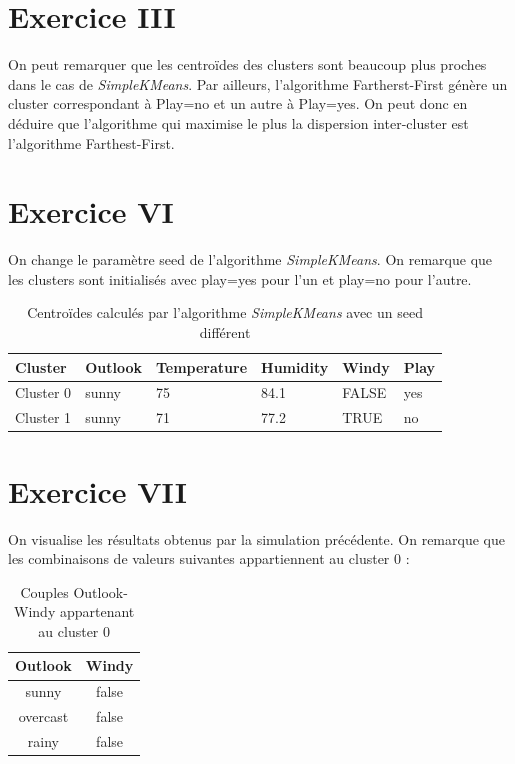 \documentclass[a4paper, 11pt]{report}
\begin{document}
        \section{Exercice III}
        On peut remarquer que les centroïdes des clusters sont beaucoup plus proches dans le cas de \emph{SimpleKMeans}. Par ailleurs, l'algorithme Fartherst-First génère un cluster correspondant à Play=no et un autre à Play=yes. On peut donc en déduire que l'algorithme qui maximise le plus la dispersion inter-cluster est l'algorithme Farthest-First.
        
        \section{Exercice VI}
        On change le paramètre seed de l'algorithme \emph{SimpleKMeans}. On remarque que les clusters sont initialisés avec play=yes pour l'un et play=no pour l'autre.
        \begin{table}[h!]
        \centering
        \begin{tabular}{| l | l | l | l | l | l |}
        \hline
        Cluster & Outlook & Temperature & Humidity & Windy & Play \\
        \hline
        Cluster 0 & sunny & 75 & 84.1 & FALSE & yes \\
        \hline
        Cluster 1 & sunny & 71 & 77.2 & TRUE & no \\
        \hline

        \end{tabular}
        \caption{Centroïdes calculés par l'algorithme \emph{SimpleKMeans} avec un seed différent}
        \label{tab:exo_6}
        \end{table}
        
        \section{Exercice VII}
        On visualise les résultats obtenus par la simulation précédente. On remarque que les combinaisons de valeurs suivantes appartiennent au cluster 0 :
        \begin{table}[h!]
        \centering
        \begin{tabular}{| c | c |}
         \hline
         Outlook & Windy \\
         \hline
         sunny & false \\
         overcast & false \\
         rainy & false \\
         \hline
        
        \end{tabular}
        \caption{Couples Outlook-Windy appartenant au cluster 0}
        \label{tab:exo7_1}
        \end{table}
        
\end{document}
